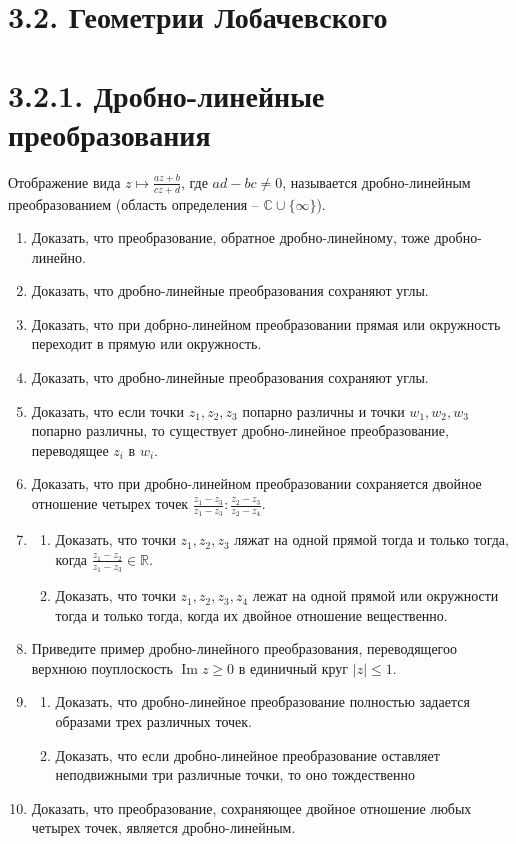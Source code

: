 	\section{3.2. Геометрии Лобачевского}

	\section{3.2.1. Дробно-линейные преобразования}

	Отображение вида $z \mapsto \frac{az + b}{cz + d}$, где $ad - bc \ne 0$, называется дробно-линейным преобразованием (область определения -- $\mathbb{C} \cup \{\infty\}$).

	\begin{enumerate}
		\item Доказать, что преобразование, обратное дробно-линейному, тоже дробно-линейно.
		\item Доказать, что дробно-линейные преобразования сохраняют углы.
		\item Доказать, что при добрно-линейном преобразовании прямая или окружность переходит в прямую или окружность.
		\item Доказать, что дробно-линейные преобразования сохраняют углы.
		\item Доказать, что если точки $z_1, z_2, z_3$ попарно различны и точки $w_1, w_2, w_3$ попарно различны, то существует дробно-линейное преобразование, переводящее $z_i$ в $w_i$.
		\item Доказать, что при дробно-линейном преобразовании сохраняется двойное отношение четырех точек $ \frac{z_1 - z_3}{z_1 - z_3} : \frac{z_2 - z_3}{z_2 - z_4}$.
		\item
		\begin{enumerate}
			\item Доказать, что точки $z_1, z_2, z_3$ ляжат на одной прямой тогда и только тогда, когда $\frac{z_1 - z_2}{z_1 - z_3} \in \mathbb{R}$.
			\item Доказать, что точки $z_1, z_2, z_3, z_4$ лежат на одной прямой или окружности тогда и только тогда, когда их двойное отношение вещественно.
		\end{enumerate}
		\item Приведите пример дробно-линейного преобразования, переводящегоо верхнюю поуплоскость $\operatorname{Im} z \ge 0$ в единичный круг $|z| \le 1$.
		\item
		\begin{enumerate}
			\item Доказать, что дробно-линейное преобразование полностью задается образами трех различных точек.
			\item Доказать, что если дробно-линейное преобразование оставляет неподвижными три различные точки, то оно тождественно
		\end{enumerate}
		\item Доказать, что преобразование, сохраняющее двойное отношение любых четырех точек, является дробно-линейным.
	\end{enumerate}
